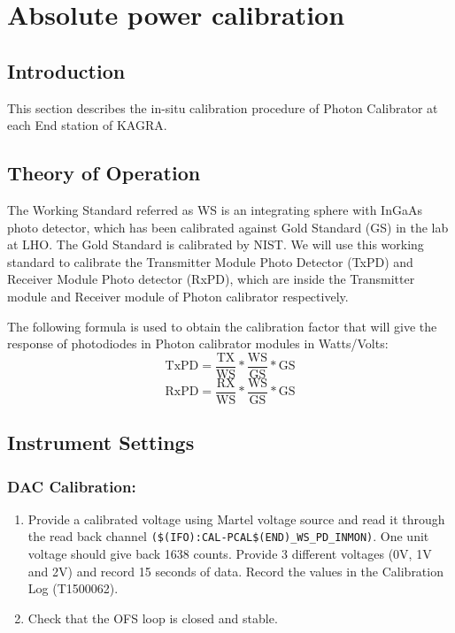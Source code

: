 
\chapter{Absolute power calibration} %
\label{Chapter6} %
\section{Introduction}
\label{sec:intro}
This section describes the in-situ calibration procedure of Photon Calibrator at each End station of KAGRA.

\section{Theory of Operation}

The Working Standard referred as WS  is an integrating sphere with InGaAs photo detector, which has been calibrated against Gold Standard (GS) in the lab at LHO. The Gold Standard is calibrated by NIST. We will use this working standard to calibrate the Transmitter Module Photo Detector (TxPD) and Receiver Module Photo detector (RxPD), which are inside the Transmitter module and Receiver module of Photon calibrator respectively.

The following formula is used to obtain the calibration factor that will give the response of photodiodes in Photon calibrator modules in Watts/Volts:
\
\begin{equation}
\mathrm{TxPD} = \frac{\mathrm{TX}}{\mathrm{WS}}*\frac{\mathrm{WS}}{\mathrm{GS}}*\mathrm{GS}
\end{equation}
\begin{equation}
\mathrm{RxPD} = \frac{\mathrm{RX}}{\mathrm{WS}}*\frac{\mathrm{WS}}{\mathrm{GS}}*\mathrm{GS}
\end{equation}
%
\section{Instrument Settings}
\subsection{DAC Calibration:}
\begin{enumerate}
\item Provide a calibrated voltage using Martel voltage source and read it through the read back channel \verb|($(IFO):CAL-PCAL$(END)_WS_PD_INMON)|. One unit voltage should give back 1638 counts.  Provide 3 different voltages (0V, 1V and 2V) and record 15 seconds of data.  Record the values in the Calibration Log (T1500062).
\item Check that the OFS loop is closed and stable.
\end{enumerate}

